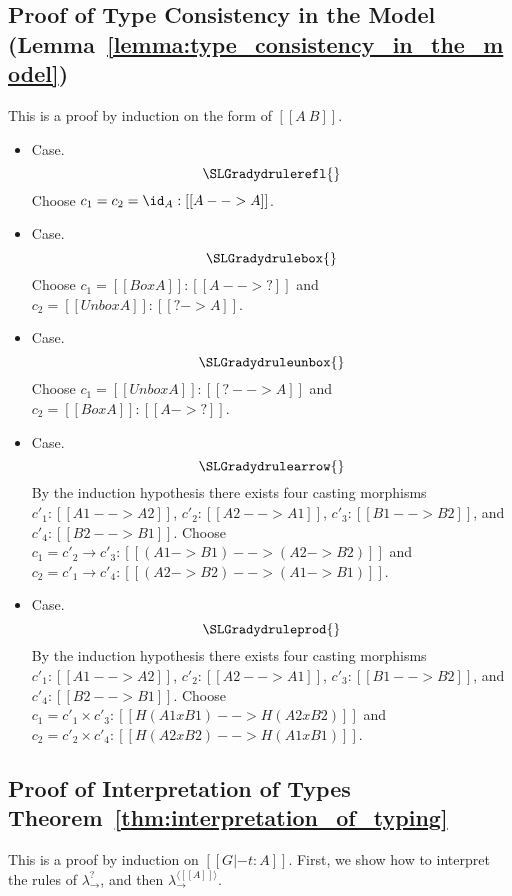 \subsection{Proof of Type Consistency in the Model (Lemma~\ref{lemma:type_consistency_in_the_model})}
\label{subsec:proof_of_type_consistency_in_the_model}
This is a proof by induction on the form of $[[A ~ B]]$.
\begin{itemize}
\item[] Case.
  \[
  \SLGradydrulerefl{}
  \]
  Choose $c_1 = c_2 = \id_A : [[A --> A]]$.

\item[] Case.
  \[
  \SLGradydrulebox{}
  \]
  Choose $c_1 = [[Box A]] : [[A --> ?]]$ and $c_2 = [[Unbox A]] : [[? -> A]]$.

\item[] Case.
  \[
  \SLGradydruleunbox{}
  \]
  Choose $c_1 = [[Unbox A]] : [[? --> A]]$ and $c_2 = [[Box A]] : [[A -> ?]]$.
  
\item[] Case.
  \[
  \SLGradydrulearrow{}
  \]
  By the induction hypothesis there exists four casting morphisms
  $c'_1 : [[A1 --> A2]]$, $c'_2 : [[A2 --> A1]]$, $c'_3 : [[B1 --> B2]]$,
  and $c'_4 : [[B2 --> B1]]$.  Choose
  $c_1 = c'_2 \to c'_3 : [[(A1 -> B1) --> (A2 -> B2)]]$
  and
  $c_2 = c'_1 \to c'_4 : [[(A2 -> B2) --> (A1 -> B1)]]$.

\item[] Case.
  \[
  \SLGradydruleprod{}
  \]
  By the induction hypothesis there exists four casting morphisms
  $c'_1 : [[A1 --> A2]]$, $c'_2 : [[A2 --> A1]]$, $c'_3 : [[B1 --> B2]]$,
  and $c'_4 : [[B2 --> B1]]$.
  Choose
  $c_1 = c'_1 \times c'_3 : [[H(A1 x B1) --> H(A2 x B2)]]$
  and
  $c_2 = c'_2 \times c'_4 : [[H(A2 x B2) --> H(A1 x B1)]]$.
\end{itemize}

\subsection{Proof of Interpretation of Types Theorem~\ref{thm:interpretation_of_typing}}
\label{subsec:proof_of_interpretation_of_types}
This is a proof by induction on $[[G |- t : A]]$.  First, we show
how to interpret the rules of $\lambda^?_\to$, and then
$\lambda^{\langle [[A]] \rangle}_\to$.

